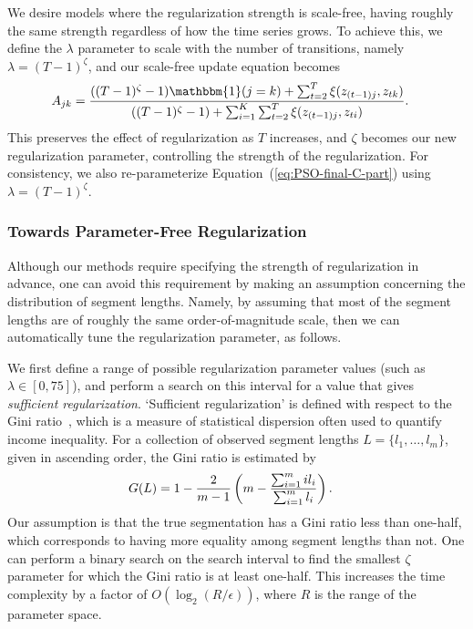 \documentclass[letterpaper]{article}
\begin{document}
We desire models where the regularization strength is scale-free, having roughly the same strength regardless of how the time series grows. To achieve this, we define the $\lambda$ parameter to scale with the number of transitions, namely $\lambda = (T-1)^\zeta$, and our scale-free update equation becomes
\begin{align}\label{eq:SCALE-FREE-MAP}
  \setlength{\abovedisplayskip}{0pt}
  \setlength{\belowdisplayskip}{0pt}
    A_{jk} &= \frac{((T - 1)^{\zeta}-1){\mathbbm{1}(j = k)} + \sum_{t=2}^{T} \xi(z_{(t-1)j}, z_{tk})}   
    {((T - 1)^{\zeta} - 1) + \sum_{i=1}^{K}\sum_{t=2}^{T} \xi(z_{(t-1)j}, z_{ti})}.
\end{align}
This preserves the effect of regularization as $T$ increases, and $\zeta$
becomes our new regularization parameter, controlling the strength of the
regularization. For consistency, we also re-parameterize
Equation~(\ref{eq:PSO-final-C-part}) using $\lambda = (T-1)^\zeta$.

\subsubsection{Towards Parameter-Free Regularization}\label{sec:param-free}

Although our methods require specifying the strength of regularization in advance, one can avoid this requirement by making an assumption concerning the distribution of segment lengths. Namely, by assuming that most of the segment lengths are of roughly the same order-of-magnitude scale, then we can automatically tune the regularization parameter, as follows.

We first define a range of possible regularization parameter values (such as
$\lambda \in [0, 75]$), and perform a search on this interval for a value that
gives \emph{sufficient regularization}. `Sufficient regularization' is defined
with respect to the Gini ratio~\cite{gini1936,wiki:1}, which is a measure of
statistical dispersion often used to quantify income inequality. For a
collection of observed segment lengths $L = \{l_1, \ldots, l_m\}$, given in
ascending order, the Gini ratio is estimated by
\begin{align*}
  \setlength{\abovedisplayskip}{0pt}
  \setlength{\belowdisplayskip}{0pt}
    G(L) &= 1 - \frac{2}{m-1}\left(m - \frac{\sum_{i=1}^{m} i l_i}{\sum_{i=1}^{m} l_i}\right).
\end{align*}
Our assumption is that the true segmentation has a Gini ratio less than
one-half, which corresponds to having more equality among segment lengths than
not. One can perform a binary search on the search interval to find the smallest
$\zeta$ parameter for which the Gini ratio is at least one-half. This increases
the time complexity by a factor of $O(\log_2 (R / \epsilon))$, where $R$ is the
range of the parameter space.
\end{document}
